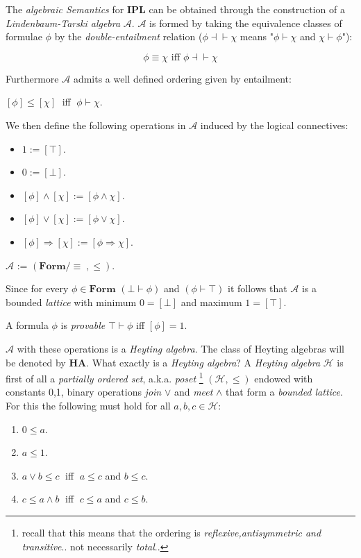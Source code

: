 		
		The \emph{algebraic Semantics} for \textbf{IPL} can be obtained through the construction of a \emph{Lindenbaum-Tarski algebra} $\mathcal{A}$. \newline
		$\mathcal{A}$ is formed by taking the equivalence classes of formulae $\phi$ by the \emph{double-entailment} relation ($\phi \dashv\vdash \chi$ means "$\phi\vdash\chi$ and $\chi\vdash\phi$"):

\[ \phi \equiv \chi \text{ iff } \phi \dashv\vdash \chi\] 


		Furthermore $\mathcal{A}$ admits a well defined ordering given by entailment:
		\begin{definition}
			$[\phi] \leq [\chi] \;$	iff		$\; \phi \vdash \chi $.
		\end{definition}
		We then define the following operations in $\mathcal{A}$ induced by the logical connectives:
		\begin{itemize}
			\item $1 := [\top]$.
			\item $0 := [\bot]$.
			\item $[\phi] \land [\chi] := [\phi \land \chi]$.
			\item $[\phi] \lor [\chi] := [\phi \lor \chi]$.
			\item $[\phi] \Rightarrow [\chi] := [\phi \Rightarrow \chi]$.
	\end{itemize}

	\begin{definition}
		$\mathcal{A}$ := $(\textbf{Form}/\equiv\;, \leq)$.
	\end{definition}
	Since for every $\phi \in \textbf{Form}$ $(\bot \vdash \phi)$ and $(\phi \vdash \top)$ it follows that
	$\mathcal{A}$ is a bounded \emph{lattice} with minimum  $0 = [\bot]$ and maximum $1 = [\top]$.

\begin{prop}
	A formula $\phi$ is \emph{provable} $\top \vdash \phi$ iff $[\phi] = 1$.
\end{prop}
 		$\mathcal{A}$ with these operations is a \emph{Heyting algebra}. \newline
 		The class of Heyting algebras will be denoted by $\mathbf{HA}$. \newline
 		 What exactly is a \emph{Heyting algebra}?
 	\newline
 		A \emph{Heyting algebra} $\mathcal{H}$ is first of all a \emph{partially ordered set}, a.k.a. \emph{poset} \footnote{recall that this means that the ordering is \emph{reflexive,antisymmetric and transitive}.. not necessarily \emph{total}..}
 		$(\mathcal{H}, \leq)$ endowed with constants 0,1, binary operations \emph{join} $\lor$ and \emph{meet} $\land$
 		that form a \emph{bounded lattice}. For this the following must hold for all $a,b,c \in \mathcal{H}$:
 		 		\begin{enumerate}
 			 			\item $0 \leq a$.
 			 			\item $a \leq 1$.
 			  			\item $a \lor b \leq c \;$ iff $\;a \leq c$ and $b \leq c$.
 						\item $c \leq a \land b \;$ iff $\;c \leq a$ and $c \leq b$.
 				\end{enumerate} 
 	
